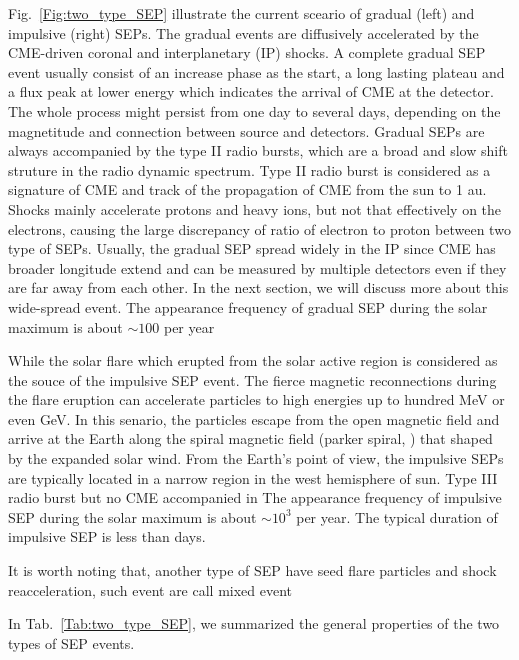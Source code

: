 Fig.~\ref{Fig:two_type_SEP} illustrate the current sceario of gradual (left) and impulsive (right) \acp{SEP}.
The gradual events are diffusively accelerated by the CME-driven coronal and interplanetary (IP) shocks. 
A complete gradual \ac{SEP} event usually consist of an increase phase as the start, a long lasting plateau and a flux peak at lower energy which indicates the arrival of \ac{CME} at the detector. The whole process might persist from one day to several days, depending on the magnetitude and connection between source and detectors. Gradual \acp{SEP} are always accompanied by the type II radio bursts, which are a broad and slow shift struture in the radio dynamic spectrum. Type II radio burst is considered as a signature of \ac{CME} and track of the propagation of \ac{CME} from the sun to 1 au. Shocks mainly accelerate protons and heavy ions, but not that effectively on the electrons, causing the large discrepancy of ratio of electron to proton between two type of \acp{SEP}.
Usually, the gradual \ac{SEP} spread widely in the IP since \ac{CME} has broader longitude extend and can be measured by multiple detectors even if they are far away from each other. In the next section, we will discuss more about this wide-spread event. The appearance frequency of gradual \ac{SEP} during the solar maximum is about $\sim 100$ per year

While the solar flare which erupted from the solar active region is considered as the souce of the impulsive \ac{SEP} event. The fierce magnetic reconnections during the flare eruption can accelerate particles to high energies up to hundred MeV or even GeV. In this senario, the particles escape from the open magnetic field and arrive at the Earth along the spiral magnetic field (parker spiral, \citep{Parker-1958}) that shaped by the expanded solar wind. From the Earth's point of view, the impulsive \acp{SEP} are typically located in a narrow region in the west hemisphere of sun. Type III radio burst but no CME accompanied in
The appearance frequency of impulsive \ac{SEP} during the solar maximum is about $\sim 10^3$ per year. The typical duration of impulsive \ac{SEP} is less than days.

It is worth noting that, another type of SEP  have seed flare particles and shock reacceleration, such event are call mixed event \citet{cane2003two}

In Tab.~\ref{Tab:two_type_SEP}, we summarized the general properties of the two types of \ac{SEP} events.

